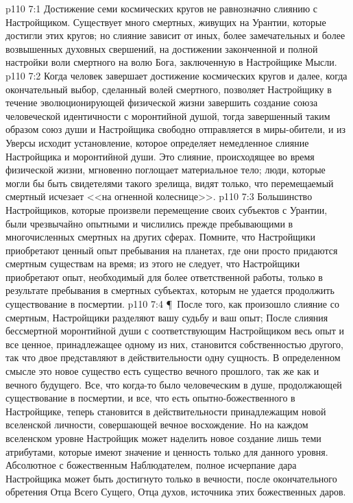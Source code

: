 \vs p110 7:1 Достижение семи космических кругов не равнозначно слиянию с Настройщиком. Существует много смертных, живущих на Урантии, которые достигли этих кругов; но слияние зависит от иных, более замечательных и более возвышенных духовных свершений, на достижении законченной и полной настройки воли смертного на волю Бога, заключенную в Настройщике Мысли.
\vs p110 7:2 Когда человек завершает достижение космических кругов и далее, когда окончательный выбор, сделанный волей смертного, позволяет Настройщику в течение эволюционирующей физической жизни завершить создание союза человеческой идентичности с моронтийной душой, тогда завершенный таким образом союз души и Настройщика свободно отправляется в миры\hyp{}обители, и из Уверсы исходит установление, которое определяет немедленное слияние Настройщика и моронтийной души. Это слияние, происходящее во время физической жизни, мгновенно поглощает материальное тело; люди, которые могли бы быть свидетелями такого зрелища, видят только, что перемещаемый смертный исчезает <<на огненной колеснице>>.
\vs p110 7:3 Большинство Настройщиков, которые произвели перемещение своих субъектов с Урантии, были чрезвычайно опытными и числились прежде пребывающими в многочисленных смертных на других сферах. Помните, что Настройщики приобретают ценный опыт пребывания на планетах, где они просто придаются смертным существам на время; из этого не следует, что Настройщики приобретают опыт, необходимый для более ответственной работы, только в результате пребывания в смертных субъектах, которым не удается продолжить существование в посмертии.
\vs p110 7:4 \P\ После того, как произошло слияние со смертным, Настройщики разделяют вашу судьбу и ваш опыт;  После слияния бессмертной моронтийной души с соответствующим Настройщиком весь опыт и все ценное, принадлежащее одному из них, становится собственностью другого, так что двое представляют в действительности одну сущность. В определенном смысле это новое существо есть существо вечного прошлого, так же как и вечного будущего. Все, что когда\hyp{}то было человеческим в душе, продолжающей существование в посмертии, и все, что есть опытно\hyp{}божественного в Настройщике, теперь становится в действительности принадлежащим новой вселенской личности, совершающей вечное восхождение. Но на каждом вселенском уровне Настройщик может наделить новое создание лишь теми атрибутами, которые имеют значение и ценность только для данного уровня. Абсолютное  с божественным Наблюдателем, полное исчерпание дара Настройщика может быть достигнуто только в вечности, после окончательного обретения Отца Всего Сущего, Отца духов, источника этих божественных даров.
